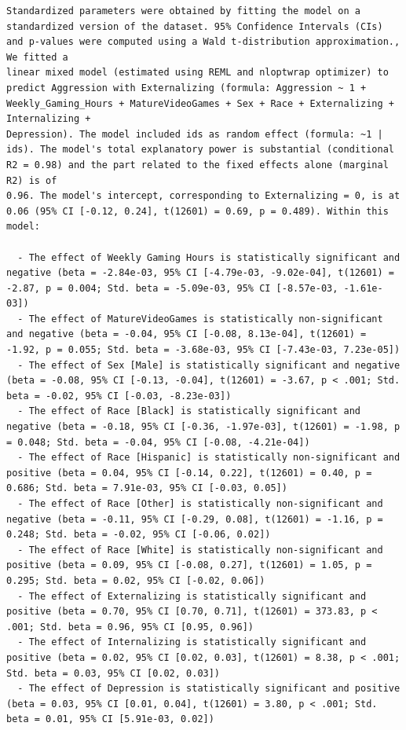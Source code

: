 \documentclass{article}
\begin{document}
\begin{verbatim}
Standardized parameters were obtained by fitting the model on a standardized version of the dataset. 95% Confidence Intervals (CIs) and p-values were computed using a Wald t-distribution approximation., We fitted a
linear mixed model (estimated using REML and nloptwrap optimizer) to predict Aggression with Externalizing (formula: Aggression ~ 1 + Weekly_Gaming_Hours + MatureVideoGames + Sex + Race + Externalizing + Internalizing +
Depression). The model included ids as random effect (formula: ~1 | ids). The model's total explanatory power is substantial (conditional R2 = 0.98) and the part related to the fixed effects alone (marginal R2) is of
0.96. The model's intercept, corresponding to Externalizing = 0, is at 0.06 (95% CI [-0.12, 0.24], t(12601) = 0.69, p = 0.489). Within this model:

  - The effect of Weekly Gaming Hours is statistically significant and negative (beta = -2.84e-03, 95% CI [-4.79e-03, -9.02e-04], t(12601) = -2.87, p = 0.004; Std. beta = -5.09e-03, 95% CI [-8.57e-03, -1.61e-03])
  - The effect of MatureVideoGames is statistically non-significant and negative (beta = -0.04, 95% CI [-0.08, 8.13e-04], t(12601) = -1.92, p = 0.055; Std. beta = -3.68e-03, 95% CI [-7.43e-03, 7.23e-05])
  - The effect of Sex [Male] is statistically significant and negative (beta = -0.08, 95% CI [-0.13, -0.04], t(12601) = -3.67, p < .001; Std. beta = -0.02, 95% CI [-0.03, -8.23e-03])
  - The effect of Race [Black] is statistically significant and negative (beta = -0.18, 95% CI [-0.36, -1.97e-03], t(12601) = -1.98, p = 0.048; Std. beta = -0.04, 95% CI [-0.08, -4.21e-04])
  - The effect of Race [Hispanic] is statistically non-significant and positive (beta = 0.04, 95% CI [-0.14, 0.22], t(12601) = 0.40, p = 0.686; Std. beta = 7.91e-03, 95% CI [-0.03, 0.05])
  - The effect of Race [Other] is statistically non-significant and negative (beta = -0.11, 95% CI [-0.29, 0.08], t(12601) = -1.16, p = 0.248; Std. beta = -0.02, 95% CI [-0.06, 0.02])
  - The effect of Race [White] is statistically non-significant and positive (beta = 0.09, 95% CI [-0.08, 0.27], t(12601) = 1.05, p = 0.295; Std. beta = 0.02, 95% CI [-0.02, 0.06])
  - The effect of Externalizing is statistically significant and positive (beta = 0.70, 95% CI [0.70, 0.71], t(12601) = 373.83, p < .001; Std. beta = 0.96, 95% CI [0.95, 0.96])
  - The effect of Internalizing is statistically significant and positive (beta = 0.02, 95% CI [0.02, 0.03], t(12601) = 8.38, p < .001; Std. beta = 0.03, 95% CI [0.02, 0.03])
  - The effect of Depression is statistically significant and positive (beta = 0.03, 95% CI [0.01, 0.04], t(12601) = 3.80, p < .001; Std. beta = 0.01, 95% CI [5.91e-03, 0.02])


\end{verbatim}
\end{document}
